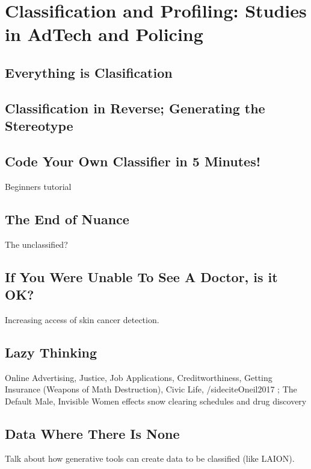 \setchapterpreamble[u]{\margintoc}
\chapter{Classification and Profiling: Studies in AdTech and Policing}

\section{Everything is Clasification}

\section{Classification in Reverse; Generating the Stereotype}

\section{Code Your Own Classifier in 5 Minutes!}

Beginners tutorial

\section{The End of Nuance}

The unclassified?

\section{If You Were Unable To See A Doctor, is it OK?}

Increasing access of skin cancer detection.

\section{Lazy Thinking}

Online Advertising, Justice, Job Applications, Creditworthiness, Getting Insurance (Weapons of Math Destruction), Civic Life, /sidecite{Oneil2017} ; The Default Male, Invisible Women effects snow clearing schedules and drug discovery

\section{Data Where There Is None}

Talk about how generative tools can create data to be classified (like LAION).

